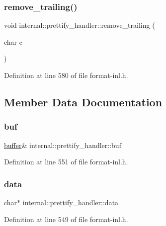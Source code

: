 \subsubsection{\texorpdfstring{remove\+\_\+trailing()}{remove\_trailing()}}
{\footnotesize\ttfamily void internal\+::prettify\+\_\+handler\+::remove\+\_\+trailing (\begin{DoxyParamCaption}\item[{char}]{c }\end{DoxyParamCaption})\hspace{0.3cm}{\ttfamily [inline]}}



Definition at line 580 of file format-\/inl.\+h.



\subsection{Member Data Documentation}
\mbox{\label{structinternal_1_1prettify__handler_a4dff35fc9f5fb77e2d294be91dc9a0b9}} 
\subsubsection{\texorpdfstring{buf}{buf}}
{\footnotesize\ttfamily \hyperlink{namespaceinternal_a5fcdbc3efad1f390e6c3f0fdafa56122}{buffer}\& internal\+::prettify\+\_\+handler\+::buf}



Definition at line 551 of file format-\/inl.\+h.

\mbox{\label{structinternal_1_1prettify__handler_ad15c526bcb66f483380a4bdda8501513}} 
\subsubsection{\texorpdfstring{data}{data}}
{\footnotesize\ttfamily char$\ast$ internal\+::prettify\+\_\+handler\+::data}



Definition at line 549 of file format-\/inl.\+h.

